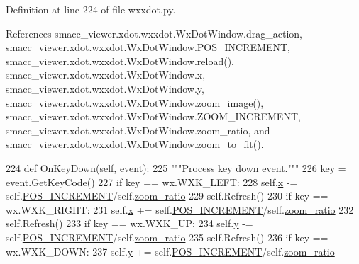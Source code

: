 Definition at line 224 of file wxxdot.\+py.



References smacc\+\_\+viewer.\+xdot.\+wxxdot.\+Wx\+Dot\+Window.\+drag\+\_\+action, smacc\+\_\+viewer.\+xdot.\+wxxdot.\+Wx\+Dot\+Window.\+P\+O\+S\+\_\+\+I\+N\+C\+R\+E\+M\+E\+NT, smacc\+\_\+viewer.\+xdot.\+wxxdot.\+Wx\+Dot\+Window.\+reload(), smacc\+\_\+viewer.\+xdot.\+wxxdot.\+Wx\+Dot\+Window.\+x, smacc\+\_\+viewer.\+xdot.\+wxxdot.\+Wx\+Dot\+Window.\+y, smacc\+\_\+viewer.\+xdot.\+wxxdot.\+Wx\+Dot\+Window.\+zoom\+\_\+image(), smacc\+\_\+viewer.\+xdot.\+wxxdot.\+Wx\+Dot\+Window.\+Z\+O\+O\+M\+\_\+\+I\+N\+C\+R\+E\+M\+E\+NT, smacc\+\_\+viewer.\+xdot.\+wxxdot.\+Wx\+Dot\+Window.\+zoom\+\_\+ratio, and smacc\+\_\+viewer.\+xdot.\+wxxdot.\+Wx\+Dot\+Window.\+zoom\+\_\+to\+\_\+fit().


\begin{DoxyCode}
224   \textcolor{keyword}{def }\hyperlink{classsmacc__viewer_1_1xdot_1_1wxxdot_1_1WxDotWindow_af355430a6c37ee9bec65fdde2e3f1249}{OnKeyDown}(self, event):
225     \textcolor{stringliteral}{"""Process key down event."""}
226     key = event.GetKeyCode()
227     \textcolor{keywordflow}{if} key == wx.WXK\_LEFT:
228       self.\hyperlink{classsmacc__viewer_1_1xdot_1_1wxxdot_1_1WxDotWindow_af93c06ad884159a0fcfba52dcbc0ac54}{x} -= self.\hyperlink{classsmacc__viewer_1_1xdot_1_1wxxdot_1_1WxDotWindow_a4fe4496d25079b302132906e1b1e1367}{POS\_INCREMENT}/self.\hyperlink{classsmacc__viewer_1_1xdot_1_1wxxdot_1_1WxDotWindow_ab53373bad50bdff06f2b31afa577fca2}{zoom\_ratio}
229       self.Refresh()
230     \textcolor{keywordflow}{if} key == wx.WXK\_RIGHT:
231       self.\hyperlink{classsmacc__viewer_1_1xdot_1_1wxxdot_1_1WxDotWindow_af93c06ad884159a0fcfba52dcbc0ac54}{x} += self.\hyperlink{classsmacc__viewer_1_1xdot_1_1wxxdot_1_1WxDotWindow_a4fe4496d25079b302132906e1b1e1367}{POS\_INCREMENT}/self.\hyperlink{classsmacc__viewer_1_1xdot_1_1wxxdot_1_1WxDotWindow_ab53373bad50bdff06f2b31afa577fca2}{zoom\_ratio}
232       self.Refresh()
233     \textcolor{keywordflow}{if} key == wx.WXK\_UP:
234       self.\hyperlink{classsmacc__viewer_1_1xdot_1_1wxxdot_1_1WxDotWindow_add4a798dbd2255643a4dadf0e7cc417c}{y} -= self.\hyperlink{classsmacc__viewer_1_1xdot_1_1wxxdot_1_1WxDotWindow_a4fe4496d25079b302132906e1b1e1367}{POS\_INCREMENT}/self.\hyperlink{classsmacc__viewer_1_1xdot_1_1wxxdot_1_1WxDotWindow_ab53373bad50bdff06f2b31afa577fca2}{zoom\_ratio}
235       self.Refresh()
236     \textcolor{keywordflow}{if} key == wx.WXK\_DOWN:
237       self.\hyperlink{classsmacc__viewer_1_1xdot_1_1wxxdot_1_1WxDotWindow_add4a798dbd2255643a4dadf0e7cc417c}{y} += self.\hyperlink{classsmacc__viewer_1_1xdot_1_1wxxdot_1_1WxDotWindow_a4fe4496d25079b302132906e1b1e1367}{POS\_INCREMENT}/self.\hyperlink{classsmacc__viewer_1_1xdot_1_1wxxdot_1_1WxDotWindow_ab53373bad50bdff06f2b31afa577fca2}{zoom\_ratio}

\end{DoxyCode}
